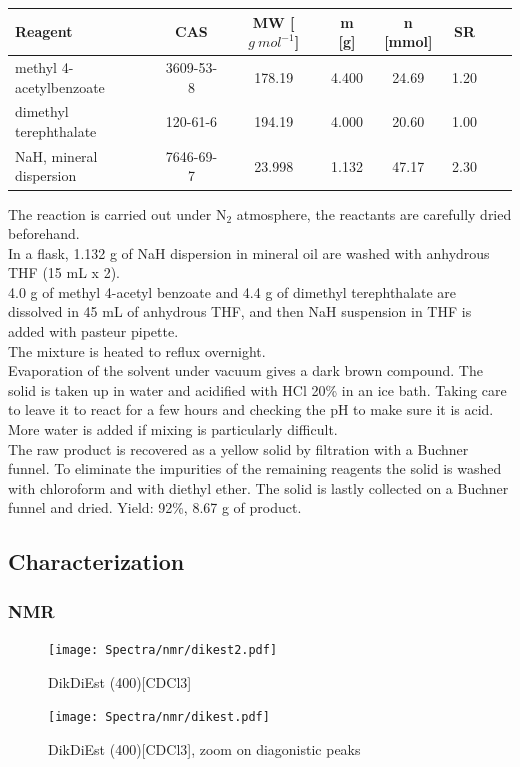 \documentclass[../Master.tex]{subfiles}
\begin{document}
\begin{center}
	\begin{tabular}[b]{lccccccc}
		\toprule
		Reagent                 & CAS       & MW  [\(g \ mol^{-1}\)] & m [g] & n [mmol] & SR   \\
		\midrule
		methyl 4-acetylbenzoate & 3609-53-8 & 178.19                 & 4.400 & 24.69    & 1.20 \\
		dimethyl terephthalate  & 120-61-6  & 194.19                 & 4.000 & 20.60    & 1.00 \\
		NaH, mineral dispersion & 7646-69-7 & 23.998                 & 1.132 & 47.17    & 2.30 \\
		\bottomrule
	\end{tabular}
\end{center}

The reaction is carried out under N$_{2}$ atmosphere, the reactants are carefully dried beforehand.\\
In a flask, 1.132 g of NaH dispersion in mineral oil are washed with anhydrous THF (15 mL x 2).\\
4.0 g of methyl 4-acetyl benzoate and 4.4 g of dimethyl terephthalate are dissolved in 45 mL of anhydrous THF, and then NaH suspension in THF is added with pasteur pipette.\\
The mixture is heated to reflux overnight. \\
Evaporation of the solvent under vacuum gives a dark brown compound. The solid is taken up in water and acidified with HCl 20\% in an ice bath. Taking care to leave it to react for a few hours and checking the pH to make sure it is acid. More water is added if mixing is particularly difficult.\\
The raw product is recovered as a yellow solid by filtration with a Buchner funnel.
To eliminate the impurities of the remaining reagents the solid is washed with chloroform and with diethyl ether. The solid is lastly collected on a Buchner funnel and dried. Yield: 92\%, 8.67 g of product.

\subsection{Characterization}
\subsubsection{NMR}
\begin{figure}[h!]
	\centering
	\texttt{[image: Spectra/nmr/dikest2.pdf]}
	\caption{DikDiEst (400)[CDCl3]}
\end{figure}
\begin{figure}[h!]
	\centering
	\texttt{[image: Spectra/nmr/dikest.pdf]}
	\caption{DikDiEst (400)[CDCl3], zoom on diagonistic peaks}
\end{figure}
\end{document}
